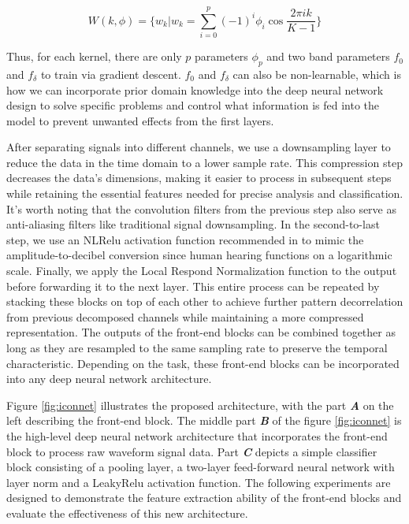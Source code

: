 \begin{equation}    
    W(k, \phi) = \biggl\{w_k \Big| w_k = \sum_{i=0}^{p}(-1)^i\phi_i\cos{\frac{2{\pi}ik}{K-1}}\biggr\}  
\end{equation}

Thus, for each kernel, there are only $p$ parameters $\phi_p$ and two band parameters $f_0$ and $f_\delta$ to train via gradient descent. $f_0$ and $f_\delta$ can also be non-learnable, which is how we can incorporate prior domain knowledge into the deep neural network design to solve specific problems and control what information is fed into the model to prevent unwanted effects from the first layers.

After separating signals into different channels, we use a downsampling layer to reduce the data in the time domain to a lower sample rate. This compression step decreases the data's dimensions, making it easier to process in subsequent steps while retaining the essential features needed for precise analysis and classification. It's worth noting that the convolution filters from the previous step also serve as anti-aliasing filters like traditional signal downsampling. In the second-to-last step, we use an NLRelu activation function recommended in \cite{liu2019naturallogrelu} to mimic the amplitude-to-decibel conversion since human hearing functions on a logarithmic scale.  Finally, we apply the Local Respond Normalization function \cite{krizhevsky2012imagenet} to the output before forwarding it to the next layer. This entire process can be repeated by stacking these blocks on top of each other to achieve further pattern decorrelation from previous decomposed channels while maintaining a more compressed representation. The outputs of the front-end blocks can be combined together as long as they are resampled to the same sampling rate to preserve the temporal characteristic. Depending on the task, these front-end blocks can be incorporated into any deep neural network architecture. 

Figure \ref{fig:iconnet} illustrates the proposed architecture, with the part \textbf{\textit{A}} on the left describing the front-end block. The middle part \textbf{\textit{B}} of the figure \ref{fig:iconnet} is the high-level deep neural network architecture that incorporates the front-end block to process raw waveform signal data. Part \textbf{\textit{C}} depicts a simple classifier block consisting of a pooling layer, a two-layer feed-forward neural network with layer norm and a LeakyRelu activation function. The following experiments are designed to demonstrate the feature extraction ability of the front-end blocks and evaluate the effectiveness of this new architecture. 

